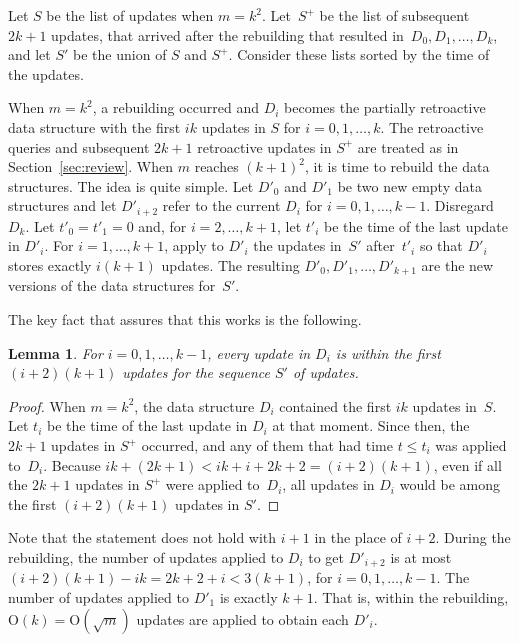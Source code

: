 \documentclass[reqno,11pt]{amsart}
\newtheorem{lemma}     	[theorem] {Lemma}
\newcommand{\Oh}{\mathrm{O}}
\begin{document}
Let $S$ be the list of updates when $m=k^2$. 
Let~$S^+$ be the list of subsequent $2k+1$ updates, 
that arrived after the rebuilding that resulted in~$D_0,D_1,\ldots,D_k$,
and let $S'$ be the union of $S$ and $S^+$.  
Consider these lists sorted by the time of the updates. 

When $m=k^2$, a rebuilding occurred and $D_i$ becomes the partially retroactive 
data structure with the first $ik$ updates in $S$ for $i=0,1,\ldots,k$. 
The retroactive queries and subsequent $2k+1$ retroactive updates in $S^+$ 
are treated as in Section~\ref{sec:review}. 
When $m$ reaches $(k+1)^2$, it is time to rebuild the data structures.  
The idea is quite simple.  Let $D'_0$ and $D'_1$ be two new empty data structures 
and let $D'_{i+2}$ refer to the current $D_i$ for $i=0,1,\ldots,k-1$.  Disregard $D_k$.   
Let $t'_0 = t'_1 = 0$ and, for $i=2,\ldots,k+1$, 
let $t'_i$ be the time of the last update in $D'_i$.
For $i=1,\ldots,k+1$, apply to $D'_i$ the updates in~$S'$ 
after~$t'_i$ so that $D'_i$ stores exactly $i(k+1)$ updates.
The resulting $D'_0,D'_1,\ldots,D'_{k+1}$ are the new versions of the data structures for~$S'$. 

\medskip 

The key fact that assures that this works is the following. 

\begin{lemma}
  For $i=0,1,\ldots,k-1$, every update in $D_i$ is within 
  the first $(i+2)(k+1)$ updates for the sequence $S'$ of updates. 
\end{lemma}

\begin{proof}
  When $m=k^2$, the data structure $D_i$ contained the first $ik$ updates in~$S$. 
  Let $t_i$ be the time of the last update in $D_i$ at that moment.
  Since then, the $2k+1$ updates in $S^+$ occurred, 
  and any of them that had time $t \leq t_i$ was applied to~$D_i$. 
  Because $ik+(2k+1) < ik+i+2k+2 = (i+2)(k+1)$, 
  even if all the $2k+1$ updates in $S^+$ were applied to~$D_i$,
  all updates in $D_i$ would be among the first $(i+2)(k+1)$ updates in $S'$. 
\end{proof}

Note that the statement does not hold with $i+1$ in the place of $i+2$. 
During the rebuilding, the number of updates applied to $D_i$ to get $D'_{i+2}$ 
is at most $(i+2)(k+1)-ik = 2k+2+i < 3(k+1)$, for $i=0,1,\ldots,k-1$.  
The number of updates applied to $D'_1$ is exactly $k+1$.  That is, within the 
rebuilding, $\Oh(k) = \Oh(\sqrt{m})$ updates are applied to obtain each $D'_i$.
\end{document}
